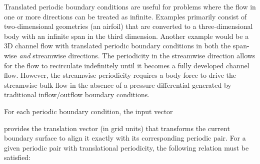 \label{SEC:BC:Numerical:Periodic:Inputs:Translated}

Translated periodic boundary conditions are useful for problems where the flow
in one or more directions can be treated as infinite.
%
Examples primarily consist of two-dimensional geometries
(\forexample an airfoil)
that are converted to a three-dimensional body with an infinite span in the
third dimension.
%
Another example would be a 3D channel flow with translated periodic boundary
conditions in both the span-wise \emph{and} streamwise directions.
%
The periodicity in the streamwise direction allows for the flow to recirculate
indefinitely until it becomes a fully developed channel flow.
%
However, the streamwise periodicity requires a body force to drive the
streamwise bulk flow in the absence of a pressure differential generated by
traditional inflow\slash outflow boundary conditions.


For each periodic boundary condition, the input vector
%
\begin{InputExample}
  \item[{\BCinpBC[nmlBC::BCInput/Periodic/Translation][i]%
                 {Periodic\%Translation(1:3)}%
                 [Periodic\%Translation]}]
\end{InputExample}
%
provides the translation vector (in grid
units) that transforms the current boundary surface to align it exactly with its
corresponding periodic pair.
%
For a given periodic pair with translational periodicity, the following relation
must be satisfied:
%
\begin{InputExample}
  \item[{\BCinptext[i]{Periodic\%Translation(:) = -}
         \BCinptext[j]{Periodic\%Translation(:)}}]
\end{InputExample}


